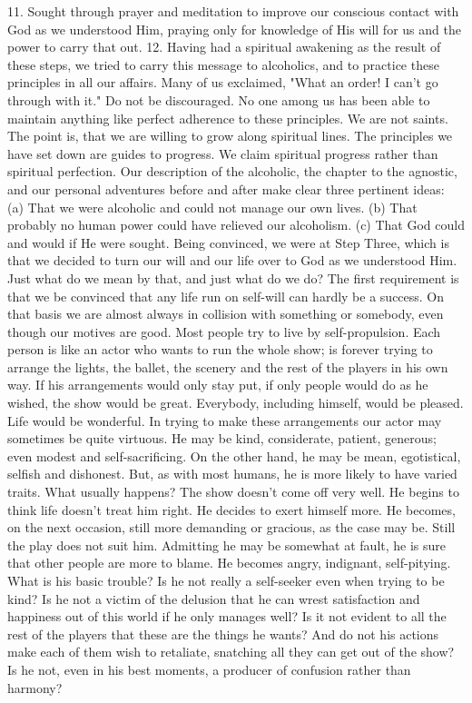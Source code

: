 \begin{biblechapter}
11. Sought through prayer and meditation to improve our conscious contact with God as we understood Him, praying only for knowledge of His will for us and the power to carry that out.
12. Having had a spiritual awakening as the result of these steps, we tried to carry this message to alcoholics, and to practice these principles in all our affairs.
Many of us exclaimed, "What an order! I can't go through with it."  Do not be discouraged.  No one among us has been able to maintain anything like perfect adherence to these principles.  We are not saints.  The point is, that we are willing to grow along spiritual lines.  The principles we have set down are guides to progress.  We claim spiritual progress rather than spiritual perfection.
Our description of the alcoholic, the chapter to the agnostic, and our personal adventures before and after make clear three pertinent ideas:
(a) That we were alcoholic and could not manage our own lives.
(b) That probably no human power could have relieved our alcoholism.
(c) That God could and would if He were sought.
Being convinced, we were at Step Three, which is that we decided to turn our will and our life over to God as we understood Him.  Just what do we mean by that, and just what do we do?
The first requirement is that we be convinced that any life run on self-will can hardly be a success.  On that basis we are almost always in collision with something or somebody, even though our motives are good.  Most people try to live by self-propulsion.  Each person is like an actor who wants to run the whole show; is forever trying to arrange the lights, the ballet, the scenery and the rest of the players in his own way.  If his arrangements would only stay put, if only people would do as he wished, the show would be great.  Everybody, including himself, would be pleased. Life would be wonderful.  In trying to make these arrangements our actor may sometimes be quite virtuous.  He may be kind, considerate, patient, generous; even modest and self-sacrificing.  On the other hand, he may be mean, egotistical, selfish and dishonest.  But, as with most humans, he is more likely to have varied traits.
What usually happens?  The show doesn't come off very well.  He begins to think life doesn't treat him right.  He decides to exert himself more.  He becomes, on the next occasion, still more demanding or gracious, as the case may be.  Still the play does not suit him.  Admitting he may be somewhat at fault, he is sure that other people are more to blame. He becomes angry, indignant, self-pitying.  What is his basic trouble?  Is he not really a self-seeker even when trying to be kind?  Is he not a victim of the delusion that he can wrest satisfaction and happiness out of this world if he only manages well?  Is it not evident to all the rest of the players that these are the things he wants?  And do not his actions make each of them wish to retaliate, snatching all they can get out of the show?  Is he not, even in his best moments, a producer of confusion rather than harmony?

\end{biblechapter}
